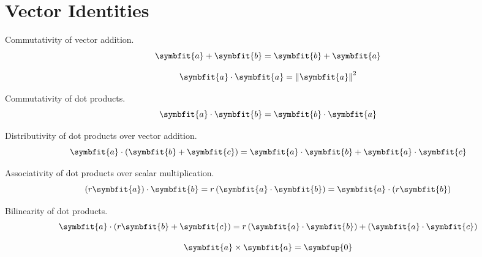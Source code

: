 \documentclass{article}
\begin{document}
\section{Vector Identities}
	\begin{theorem}
		Commutativity of vector addition.
		\begin{equation*}
			\symbfit{a} + \symbfit{b} = \symbfit{b} + \symbfit{a}
		\end{equation*}
	\end{theorem}
	\begin{theorem}
		\begin{equation*}
			\symbfit{a}\cdot\symbfit{a}=\norm{\symbfit{a}}^2
		\end{equation*}
	\end{theorem}
	\begin{theorem}
		Commutativity of dot products.
		\begin{equation*}
			\symbfit{a}\cdot \symbfit{b} = \symbfit{b}\cdot \symbfit{a}
		\end{equation*}
	\end{theorem}
	\begin{theorem}
		Distributivity of dot products over vector addition.
		\begin{equation*}
			\symbfit{a}\cdot \left(\symbfit{b}+\symbfit{c}\right) = \symbfit{a}\cdot\symbfit{b} + \symbfit{a}\cdot\symbfit{c}
		\end{equation*}
	\end{theorem}
	\begin{theorem}
		Associativity of dot products over scalar multiplication.
		\begin{equation*}
			\left(r\symbfit{a}\right)\cdot\symbfit{b} = r\left(\symbfit{a}\cdot\symbfit{b}\right)=\symbfit{a}\cdot\left(r\symbfit{b}\right)
		\end{equation*}
	\end{theorem}
	\begin{theorem}
		Bilinearity of dot products.
		\begin{equation*}
			\symbfit{a}\cdot\left(r\symbfit{b}+\symbfit{c}\right)=r\left(\symbfit{a}\cdot\symbfit{b}\right)+\left(\symbfit{a}\cdot\symbfit{c}\right)
		\end{equation*}
	\end{theorem}
	\begin{theorem}
		\begin{equation*}
			\symbfit{a}\times \symbfit{a} = \symbfup{0}
		\end{equation*}
	\end{theorem}
\end{document}
